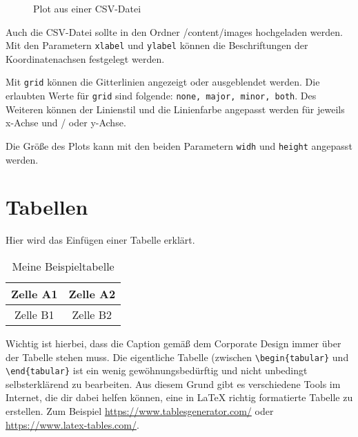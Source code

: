\begin{figure}[H]
    \centering
    \caption{Plot aus einer CSV-Datei}
    \label{fig:beispielplot}
\end{figure}

Auch die CSV-Datei sollte in den Ordner /content/images hochgeladen werden. Mit den Parametern \texttt{xlabel} und \texttt{ylabel} können die Beschriftungen der Koordinatenachsen festgelegt werden. 

Mit \texttt{grid} können die Gitterlinien angezeigt oder ausgeblendet werden. Die erlaubten Werte für \texttt{grid} sind folgende: \texttt{none, major, minor, both}. Des Weiteren können der Linienstil und die Linienfarbe angepasst werden für jeweils x-Achse und / oder y-Achse.

Die Größe des Plots kann mit den beiden Parametern \texttt{widh} und \texttt{height} angepasst werden.




\section{Tabellen}

Hier wird das Einfügen einer Tabelle erklärt.

\begin{table}[H]
    \centering
    \caption{Meine Beispieltabelle}
    \label{tab:beispiel}
    \begin{tabular}{|c|c|}
        \hline
        Zelle A1 & Zelle A2 \\
        \hline
        Zelle B1 & Zelle B2 \\
        \hline
    \end{tabular}
\end{table}

Wichtig ist hierbei, dass die Caption gemäß dem Corporate Design immer über der Tabelle stehen muss. Die eigentliche Tabelle (zwischen \texttt{\textbackslash{}begin\{tabular\}} und \texttt{\textbackslash{}end\{tabular\}} ist ein wenig gewöhnungsbedürftig und nicht unbedingt selbsterklärend zu bearbeiten. Aus diesem Grund gibt es verschiedene Tools im Internet, die dir dabei helfen können, eine in LaTeX richtig formatierte Tabelle zu erstellen. Zum Beispiel \href{https://www.tablesgenerator.com/}{https://www.tablesgenerator.com/} oder \href{https://www.latex-tables.com/}{https://www.latex-tables.com/}.

